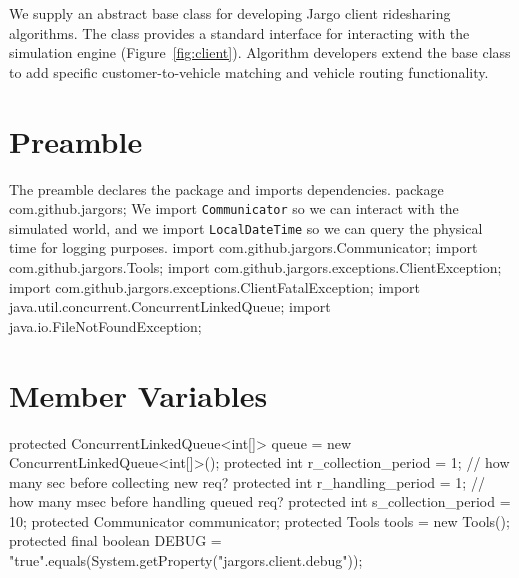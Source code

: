 We supply an abstract base class for developing Jargo client ridesharing
algorithms. The class provides a standard interface for interacting with the
simulation engine (Figure~\ref{fig:client}). Algorithm developers extend the
base class to add specific customer-to-vehicle matching and vehicle routing
functionality.

\section{Preamble}
The preamble declares the package and imports dependencies.
\nwenddocs{}\endmoddef{}
package com.github.jargors;
\nwendcode{}\nwdocspar
We import {\tt{}Communicator} so we can interact with the simulated world,
and we import {\tt{}LocalDateTime} so we can query the physical time for
logging purposes.
\nwenddocs{}\plusendmoddef
import com.github.jargors.Communicator;
import com.github.jargors.Tools;
import com.github.jargors.exceptions.ClientException;
import com.github.jargors.exceptions.ClientFatalException;
import java.util.concurrent.ConcurrentLinkedQueue;
import java.io.FileNotFoundException;
\nwendcode{}\nwdocspar

\section{Member Variables}
\nwenddocs{}\endmoddef{}
protected ConcurrentLinkedQueue<int[]> queue = new ConcurrentLinkedQueue<int[]>();
protected int r_collection_period = 1;  // how many sec before collecting new req?
protected int r_handling_period = 1;  // how many msec before handling queued req?
protected int s_collection_period = 10;
protected Communicator communicator;
protected Tools tools = new Tools();
protected final boolean DEBUG =
    "true".equals(System.getProperty("jargors.client.debug"));
\nwendcode{}\nwdocspar

